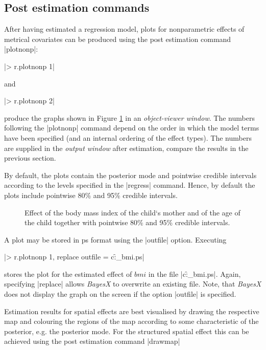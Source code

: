 \subsection{Post estimation commands}

After having estimated a regression model, plots for nonparametric effects of metrical covariates can be produced using the
post estimation command |plotnonp|:

|> r.plotnonp 1|

and

|> r.plotnonp 2|

produce the graphs shown in Figure \ref{reml:bmi1} in an {\it object-viewer window}. The numbers following the |plotnonp|
command depend on the order in which the model terms have been specified (and an internal ordering of the effect types). The
numbers are supplied in the {\it output window} after estimation, compare the results in the previous section.

By default, the plots contain the posterior mode and pointwise credible intervals according to the levels specified in the
|regress| command. Hence, by default the plots include pointwise 80\% and 95\% credible intervals.

\begin{figure}[ht]
\begin{center}
 {\it\caption{Effect of
the body mass index of the child`s mother and of the age of the
child together with pointwise 80\% and 95\% credible intervals.
\label{reml:bmi1}}}
\end{center}
\end{figure}

A plot may be stored in ps format using the |outfile| option. Executing

|> r.plotnonp 1, replace outfile = c:\data\f_bmi.ps|

stores the plot for the estimated effect of $\mathit{bmi}$ in the file |c:\data\f_bmi.ps|. Again, specifying |replace| allows
{\it BayesX} to overwrite an existing file. Note, that {\it BayesX} does not display the graph on the screen if the option
|outfile| is specified.

Estimation results for spatial effects are best visualised by drawing the respective map and colouring the regions of the map
according to some characteristic of the posterior, e.g. the posterior mode. For the structured spatial effect this can be
achieved using the post estimation command |drawmap|

